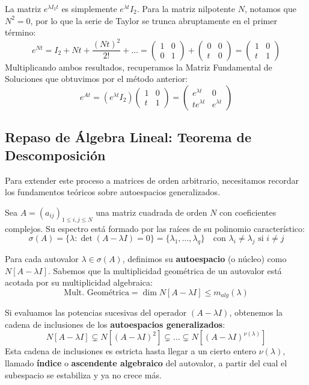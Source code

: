 La matriz $e^{\lambda I_2 t}$ es simplemente $e^{\lambda t} I_2$. Para la matriz nilpotente $N$, notamos que $N^2 = 0$, por lo que la serie de Taylor se trunca abruptamente en el primer término:
\[
    e^{Nt} = I_2 + Nt + \frac{(Nt)^2}{2!} + \dots = \begin{pmatrix} 1 & 0 \\ 0 & 1 \end{pmatrix} + \begin{pmatrix} 0 & 0 \\ t & 0 \end{pmatrix} = \begin{pmatrix} 1 & 0 \\ t & 1 \end{pmatrix}
\]
Multiplicando ambos resultados, recuperamos la Matriz Fundamental de Soluciones que obtuvimos por el método anterior:
\[
    e^{At} = \left( e^{\lambda t} I_2 \right) \begin{pmatrix} 1 & 0 \\ t & 1 \end{pmatrix} = \begin{pmatrix} e^{\lambda t} & 0 \\ t e^{\lambda t} & e^{\lambda t} \end{pmatrix}
\]

\subsection{Repaso de Álgebra Lineal: Teorema de Descomposición}

Para extender este proceso a matrices de orden arbitrario, necesitamos recordar los fundamentos teóricos sobre autoespacios generalizados.

Sea $A = (a_{ij})_{1 \le i,j \le N}$ una matriz cuadrada de orden $N$ con coeficientes complejos. Su espectro está formado por las raíces de su polinomio característico:
\[
    \sigma(A) = \{ \lambda : \det(A - \lambda I) = 0 \} = \{\lambda_1, \dots, \lambda_q\} \quad \text{con } \lambda_i \neq \lambda_j \text{ si } i \neq j
\]

Para cada autovalor $\lambda \in \sigma(A)$, definimos su \textbf{autoespacio} (o núcleo) como $N[A-\lambda I]$. Sabemos que la multiplicidad geométrica de un autovalor está acotada por su multiplicidad algebraica:
\[
    \text{Mult. Geométrica} = \dim N[A-\lambda I] \leq m_{alg}(\lambda)
\]

Si evaluamos las potencias sucesivas del operador $(A-\lambda I)$, obtenemos la cadena de inclusiones de los \textbf{autoespacios generalizados}:
\[
    N[A-\lambda I] \subsetneq N[(A-\lambda I)^2] \subsetneq \dots \subsetneq N[(A-\lambda I)^{\nu(\lambda)}]
\]
Esta cadena de inclusiones es estricta hasta llegar a un cierto entero $\nu(\lambda)$, llamado \textbf{índice} o \textbf{ascendente algebraico} del autovalor, a partir del cual el subespacio se estabiliza y ya no crece más.

